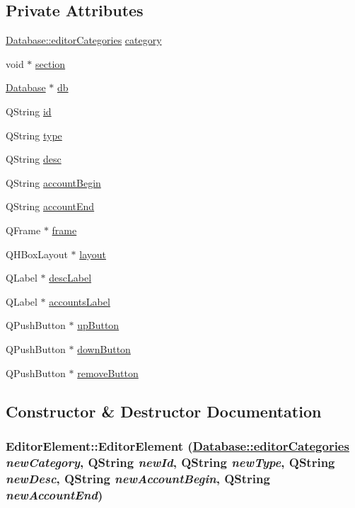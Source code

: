 \subsection*{Private Attributes}
\begin{CompactItemize}
\item 
\hyperlink{classDatabase_w8}{Database::editor\-Categories} \hyperlink{classEditorElement_r0}{category}
\item 
void $\ast$ \hyperlink{classEditorElement_r1}{section}
\item 
\hyperlink{classDatabase}{Database} $\ast$ \hyperlink{classEditorElement_r2}{db}
\item 
QString \hyperlink{classEditorElement_r3}{id}
\item 
QString \hyperlink{classEditorElement_r4}{type}
\item 
QString \hyperlink{classEditorElement_r5}{desc}
\item 
QString \hyperlink{classEditorElement_r6}{account\-Begin}
\item 
QString \hyperlink{classEditorElement_r7}{account\-End}
\item 
QFrame $\ast$ \hyperlink{classEditorElement_r8}{frame}
\item 
QHBox\-Layout $\ast$ \hyperlink{classEditorElement_r9}{layout}
\item 
QLabel $\ast$ \hyperlink{classEditorElement_r10}{desc\-Label}
\item 
QLabel $\ast$ \hyperlink{classEditorElement_r11}{accounts\-Label}
\item 
QPush\-Button $\ast$ \hyperlink{classEditorElement_r12}{up\-Button}
\item 
QPush\-Button $\ast$ \hyperlink{classEditorElement_r13}{down\-Button}
\item 
QPush\-Button $\ast$ \hyperlink{classEditorElement_r14}{remove\-Button}
\end{CompactItemize}


\subsection{Constructor \& Destructor Documentation}
\hypertarget{classEditorElement_a0}{
\subsubsection[EditorElement]{\setlength{\rightskip}{0pt plus 5cm}Editor\-Element::Editor\-Element (\hyperlink{classDatabase_w8}{Database::editor\-Categories} {\em new\-Category}, QString {\em new\-Id}, QString {\em new\-Type}, QString {\em new\-Desc}, QString {\em new\-Account\-Begin}, QString {\em new\-Account\-End})}}
\label{classEditorElement_a0}


